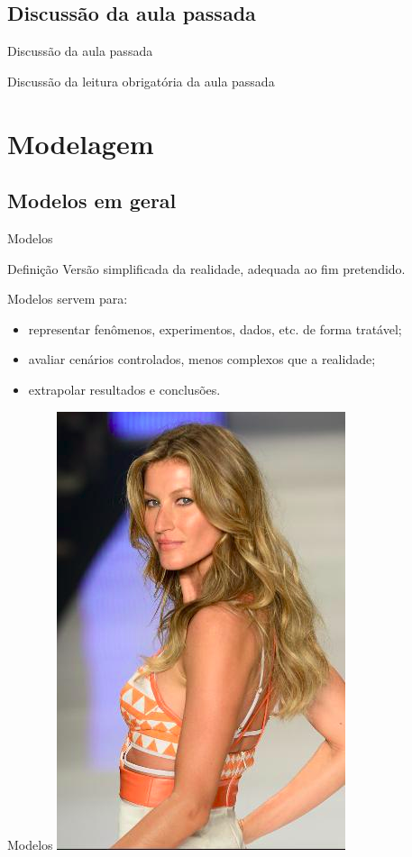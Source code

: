 \documentclass{beamer}
\begin{document}
\subsection{Discussão da aula passada}

\begin{frame}{Discussão da aula passada}
  \begin{block}{}
    Discussão da leitura obrigatória da aula passada
  \end{block}
\end{frame}

\section{Modelagem}

\subsection{Modelos em geral}

\begin{frame}{Modelos}
  \begin{block}{Definição}
    \small
    Versão simplificada da realidade, adequada ao fim pretendido.
  \end{block}
  \bigskip
  \small
  Modelos servem para:
  \begin{itemize}
    \footnotesize
  \item representar fenômenos, experimentos, dados, etc. de \alert{forma tratável};
  \item avaliar cenários controlados, menos complexos que a realidade;
  \item extrapolar resultados e conclusões.
  \end{itemize}
\end{frame}

\begin{frame}{Modelos}
  \centering
  \includegraphics[height=\textheight]{Cap18-19/gi}
\end{frame}
\end{document}
